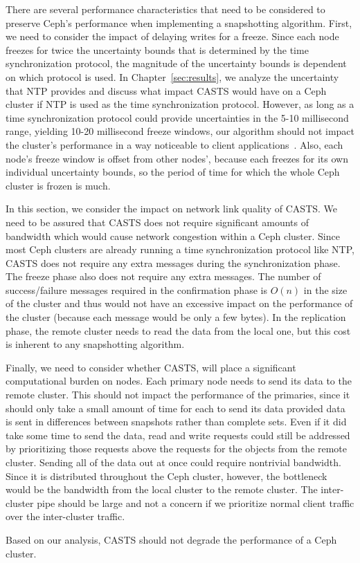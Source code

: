 There are several performance characteristics that need to be
considered to preserve Ceph's performance when implementing a
snapshotting algorithm. First, we need to consider the impact of
delaying writes for a freeze. Since each node freezes for twice the
uncertainty bounds that is determined by the time synchronization
protocol, the magnitude of the uncertainty bounds is dependent on
which protocol is used. In Chapter~\ref{sec:results}, we analyze the
uncertainty that NTP provides and discuss what impact CASTS would have
on a Ceph cluster if NTP is used as the time synchronization
protocol. However, as long as a time synchronization protocol could
provide uncertainties in the 5-10 millisecond range, yielding 10-20
millisecond freeze windows, our algorithm should not impact the
cluster's performance in a way noticeable to client
applications~\parencite{Sage}. Also, each node's freeze window is
offset from other nodes', because each freezes for its own individual
uncertainty bounds, so the period of time for which the whole Ceph cluster is
frozen is much.

In this section, we consider the impact on network link quality of
CASTS. We need to be assured that CASTS does not
require significant amounts of bandwidth which would cause network
congestion within a Ceph cluster. Since most Ceph clusters are already
running a time synchronization protocol like NTP, CASTS does
not require any extra messages during the synchronization phase. The
freeze phase also does not require any extra messages. The number of
success/failure messages required in the confirmation phase is $O(n)$
in the size of the cluster and thus would not have an excessive impact
on the performance of the cluster (because each message would be only
a few bytes). In the replication phase, the remote cluster needs to
read the data from the local one, but this cost is inherent to any
snapshotting algorithm.

Finally, we need to consider whether CASTS, will place a significant
computational burden on nodes. Each primary node needs to send its
data to the remote cluster. This should not impact the performance of
the primaries, since it should only take a small amount of time for
each to send its data provided data is sent in differences between
snapshots rather than complete sets. Even if it did take some time to
send the data, read and write requests could still be addressed by
prioritizing those requests above the requests for the objects from
the remote cluster. Sending all of the data out at once could require
nontrivial bandwidth. Since it is distributed throughout the Ceph
cluster, however, the bottleneck would be the bandwidth from the local
cluster to the remote cluster. The inter-cluster pipe should be
large and not a concern if we prioritize normal client traffic over
the inter-cluster traffic.

Based on our analysis, CASTS should not degrade the
performance of a Ceph cluster.
